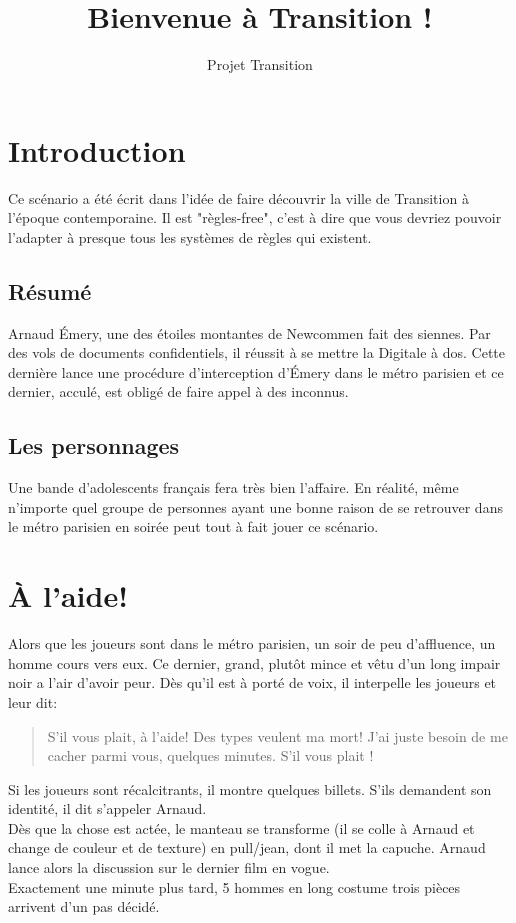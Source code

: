 \documentclass[10pt,a4paper,twocolumn]{article}
\author{Projet Transition}
\title{Bienvenue à Transition !}
\begin{document}
\maketitle
\section{Introduction}
Ce scénario a été écrit dans l'idée de faire découvrir la ville de Transition à l'époque contemporaine. Il est "règles-free", c'est à dire que vous devriez pouvoir l'adapter à presque tous les systèmes de règles qui existent.
\subsection{Résumé}
Arnaud Émery, une des étoiles montantes de Newcommen fait des siennes. Par des vols de documents confidentiels, il réussit à se mettre la Digitale à dos. Cette dernière lance une procédure d'interception d'Émery dans le métro parisien et ce dernier, acculé, est obligé de faire appel à des inconnus.
\subsection{Les personnages}
Une bande d'adolescents français fera très bien l'affaire. En réalité, même n'importe quel groupe de personnes ayant une bonne raison de se retrouver dans le métro parisien en soirée peut tout à fait jouer ce scénario.


\section{À l'aide!}
Alors que les joueurs sont dans le métro parisien, un soir de peu d'affluence, un homme cours vers eux. Ce dernier, grand, plutôt mince et vêtu d'un long impair noir a l'air d'avoir peur. Dès qu'il est à porté de voix, il interpelle les joueurs et leur dit:
\begin{quote}
S'il vous plait, à l'aide! Des types veulent ma mort! J'ai juste besoin de me cacher parmi vous, quelques minutes. S'il vous plait !
\end{quote}
Si les joueurs sont récalcitrants, il montre quelques billets. S'ils demandent son identité, il dit s'appeler Arnaud.
\\
Dès que la chose est actée, le manteau se transforme (il se colle à Arnaud et change de couleur et de texture) en pull/jean, dont il met la capuche. Arnaud lance alors la discussion sur le dernier film en vogue.\\
Exactement une minute plus tard, 5 hommes en long costume trois pièces arrivent d'un pas décidé. 
\end{document}
